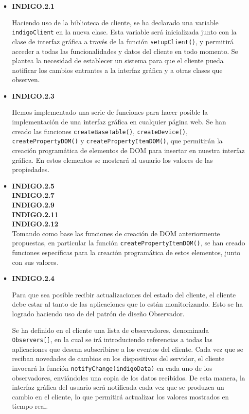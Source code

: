 \begin{itemize}[leftmargin=10mm]
	\item \textbf{INDIGO.2.1}
	
	Haciendo uso de la biblioteca de cliente, se ha declarado una variable \texttt{indigoClient} en la nueva clase. Esta variable será inicializada junto con la clase de interfaz gráfica a través de la función \texttt{setupClient()}, y permitirá acceder a todas las funcionalidades y datos del cliente en todo momento.
	Se plantea la necesidad de establecer un sistema para que el cliente pueda notificar los cambios entrantes a la interfaz gráfica y a otras clases que observen.
	
	\item \textbf{INDIGO.2.3}
	
	Hemos implementado una serie de funciones para hacer posible la implementación de una interfaz gráfica en cualquier página web. Se han creado las funciones \texttt{createBaseTable()}, \texttt{createDevice()}, \texttt{createPropertyDOM()} y \texttt{createPropertyItemDOM()}, que permitirán la creación programática de elementos de DOM para insertar en nuestra interfaz gráfica. En estos elementos se mostrará al usuario los valores de las propiedades.
	
	\item \textbf{INDIGO.2.5}\\
	\textbf{INDIGO.2.7}\\
	\textbf{INDIGO.2.9}\\
	\textbf{INDIGO.2.11}\\
	\textbf{INDIGO.2.12}\\
	Tomando como base las funciones de creación de DOM anteriormente propuestas, en particular la función \texttt{createPropertyItemDOM()}, se han creado funciones específicas para la creación programática de estos elementos, junto con sus valores.
	
	
	\item \textbf{INDIGO.2.4}
	
	 Para que sea posible recibir actualizaciones del estado del cliente, el cliente debe estar al tanto de las aplicaciones que lo están monitorizando. Esto se ha logrado haciendo uso de del patrón de diseño Observador. 
	 
	 Se ha definido en el cliente una lista de observadores, denominada \texttt{Observers[]}, en la cual se irá introduciendo referencias a todas las aplicaciones que desean subscribirse a los eventos del cliente. Cada vez que se reciban novedades de cambios en los dispositivos del servidor, el cliente invocará la función \texttt{notifyChange(indigoData)} en cada uno de los observadores, enviándoles una copia de los datos recibidos. De esta manera, la interfaz gráfica del usuario será notificada cada vez que se produzca un cambio en el cliente, lo que permitirá actualizar los valores mostrados en tiempo real.
	
\end{itemize}

